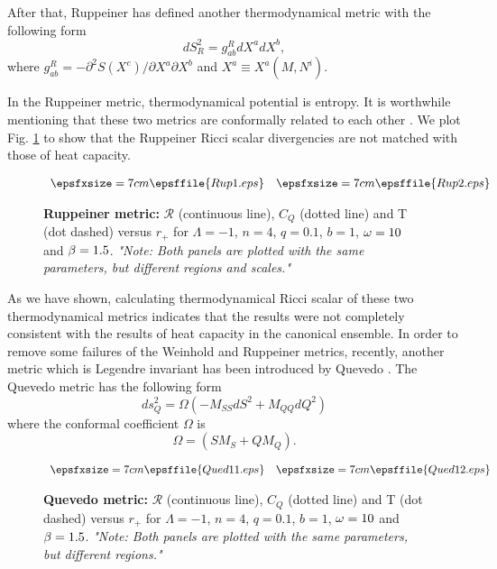 \documentclass[aps,onecolumn ]{revtex4}
\begin{document}
After that, Ruppeiner \cite{Ruppeiner1,Ruppeiner2} has defined
another thermodynamical metric with the following form
\begin{equation}
dS_{R}^{2}=g_{ab}^{R}dX^{a}dX^{b},  \label{Rupp}
\end{equation}
where $g_{ab}^{R}=-\partial ^{2}S\left( X^{c}\right) /\partial X^{a}\partial
X^{b}$ and $X^{a}\equiv X^{a}\left( M,N^{i}\right) $.

In the Ruppeiner metric, thermodynamical potential is entropy. It
is worthwhile mentioning that these two metrics are conformally
related to each other \cite{Salamon}. We plot Fig. \ref{FigR} to
show that the Ruppeiner Ricci scalar divergencies are not matched
with those of heat capacity.
\begin{figure}[tbp]
$%
\begin{array}{cc}
\epsfxsize=7cm \epsffile{Rup1.eps} & \epsfxsize=7cm \epsffile{Rup2.eps}%
\end{array}
$%
\caption{\textbf{Ruppeiner metric:} $\mathcal{R}$ (continuous line), $C_{Q}$
(dotted line) and {T} (dot dashed) versus $r_{+}$ for $\Lambda =-1$, $n=4$, $%
q=0.1$, $b=1$, $\protect\omega =10$ and $\protect\beta =1.5$.
\emph{"Note: Both panels are plotted with the same parameters, but
different regions and scales."}} \label{FigR}
\end{figure}

As we have shown, calculating thermodynamical Ricci scalar of
these two thermodynamical metrics indicates that the results were
not completely consistent with the results of heat capacity in the
canonical ensemble. In order to remove some failures of the
Weinhold and Ruppeiner metrics, recently, another metric which is
Legendre invariant has been introduced by Quevedo
\cite{Quevedo1,Quevedo2}. The Quevedo metric has the following
form
\begin{equation}
ds_{Q}^{2}=\Omega (-M_{SS}dS^{2}+M_{QQ}dQ^{2})  \label{quevedo}
\end{equation}
where the conformal coefficient $\Omega$ is
\begin{equation}
\Omega =\left( SM_{S}+QM_{Q}\right) .  \label{Omega}
\end{equation}

\begin{figure}[tbp]
$%
\begin{array}{cc}
\epsfxsize=7cm \epsffile{Qued11.eps} & \epsfxsize=7cm
\epsffile{Qued12.eps}
\end{array}
$%
\caption{\textbf{Quevedo metric:} $\mathcal{R}$ (continuous line), $C_{Q}$
(dotted line) and {T} (dot dashed) versus $r_{+}$ for $\Lambda =-1$, $n=4$, $%
q=0.1$, $b=1$, $\protect\omega =10$ and $\protect\beta =1.5$.
\emph{"Note: Both panels are plotted with the same parameters, but
different regions."}} \label{FigQ}
\end{figure}
\end{document}
